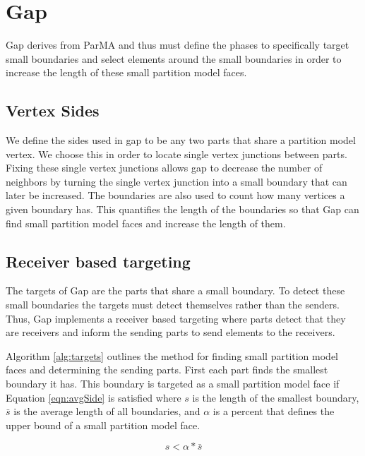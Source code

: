 \documentclass{thesis}
\begin{document}
  
\section{Gap}

Gap derives from ParMA and thus must define the phases to specifically target 
small boundaries and select elements around the small boundaries in order 
to increase the length of these small partition model faces. 

\subsection{Vertex Sides}

We define the sides used in gap to be any two parts that share a partition model 
vertex. We choose this in order to locate single vertex 
junctions between parts. Fixing these single vertex junctions allows gap to 
decrease the number of neighbors by turning the single vertex junction into 
a small boundary that can later be increased. The boundaries are also used 
to count how many vertices a given boundary has. This quantifies the length 
of the boundaries so that Gap can find small partition model faces and increase the length of them.

\subsection{Receiver based targeting}

The targets of Gap are the parts that share a small boundary. To detect 
these small boundaries the targets must detect themselves rather than the 
senders. Thus, Gap implements a receiver based targeting where parts detect 
that they are receivers and inform the sending parts to send elements to the 
receivers. 

Algorithm \ref{alg:targets} outlines the method for finding small partition 
model faces 
and determining the sending parts. First each part finds the smallest 
boundary it has. This boundary is targeted as a small partition model face if 
Equation 
\ref{eqn:avgSide} is satisfied where $s$ is the length of the smallest 
boundary, $\bar{s}$ is the average length of all boundaries, and $\alpha$ is 
a percent that defines the upper bound of a small partition model face. 

\begin{equation}
\label{eqn:avgSide}
s < \alpha * \bar{s}
\end{equation}
\end{document}
